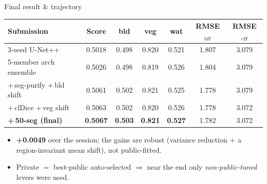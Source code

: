 \documentclass[aspectratio=169,11pt]{beamer}
\begin{document}
\begin{frame}{Final result \& trajectory}
  \begin{center}\small
  \begin{tabular}{lcccccc}
    \toprule
    Submission & Score & bld & veg & wat & RMSE$_{bH}$ & RMSE$_{vH}$\\
    \midrule
    3-seed U-Net++           & 0.5018 & 0.498 & 0.820 & 0.521 & 1.807 & 3.079\\
    5-member arch ensemble   & 0.5026 & 0.498 & 0.819 & 0.526 & 1.804 & 3.079\\
    +\,seg-purify +\,bld shift & 0.5061 & 0.502 & 0.821 & 0.525 & 1.778 & 3.079\\
    +\,clDice +\,veg shift     & 0.5063 & 0.502 & 0.820 & 0.526 & 1.778 & 3.072\\
    \textbf{+\,50-seg (final)} & \textbf{0.5067} & \textbf{0.503} & \textbf{0.821} & \textbf{0.527} & 1.782 & 3.072\\
    \bottomrule
  \end{tabular}
  \end{center}
  \begin{itemize}\small
    \item \textbf{+0.0049} over the session; the gains are robust (variance
      reduction + a region-invariant mean shift), not public-fitted.
    \item Private $=$ best-public auto-selected $\Rightarrow$ near the end only
      \emph{non-public-tuned} levers were used.
  \end{itemize}
\end{frame}
\end{document}
